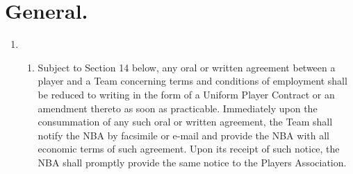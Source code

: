 \documentclass[
]{book}
\providecommand{\tightlist}{%
  \setlength{\itemsep}{0pt}\setlength{\parskip}{0pt}}
\begin{document}
\hypertarget{general.}{%
\section{General.}\label{general.}}

\begin{enumerate}
\def\labelenumi{(\alph{enumi})}
\item
  \begin{enumerate}
  \def\labelenumii{(\roman{enumii})}
  \tightlist
  \item
    Subject to Section 14 below, any oral or written agreement between a player and a Team concerning terms and conditions of employment shall be reduced to writing in the form of a Uniform Player Contract or an amendment thereto as soon as practicable. Immediately upon the consummation of any such oral or written agreement, the Team shall notify the NBA by facsimile or e-mail and provide the NBA with all economic terms of such agreement. Upon its receipt of such notice, the NBA shall promptly provide the same notice to the Players Association.


\end{enumerate}
\end{enumerate}
\end{document}
